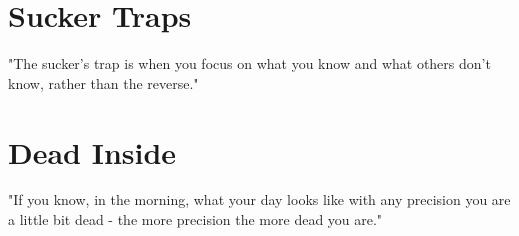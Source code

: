 \section{Sucker Traps}

"The sucker's trap is when you focus on what you know and what others don't know, rather than the reverse."

\section{Dead Inside}

"If you know, in the morning, what your day looks like with any precision you are a little bit dead - the more precision the more dead you are."
